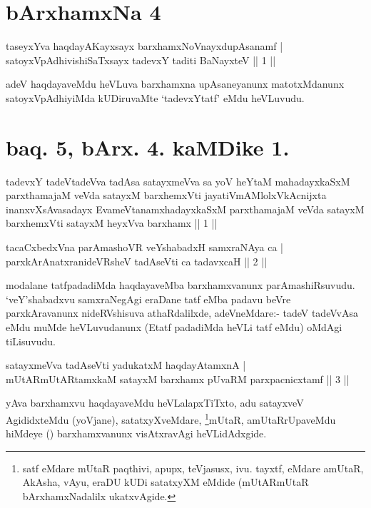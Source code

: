 
\section*{bArxhamxNa 4}

\begin{shl}
taseyxYva haqdayAKayxsayx barxhamxNoV\s nayxdupAsanamf | \\
satoyxVpAdhivishiSaTxsayx tadevxY taditi BaNayxteV \hfill ||  1 || 
\end{shl}

\begin{artha}
adeV haqdayaveMdu heVLuva barxhamxna upAsaneyanunx matotxMdanunx satoyxVpAdhiyiMda kUDiruvaMte `tadevxYtatf' eMdu heVLuvudu.
\end{artha}

\section*{baq. 5, bArx. 4. kaMDike 1.}
\begin{shl}
tadevxY tadeVtadeVva tadAsa satayxmeVva sa yoV heYtaM mahadayxkaSxM parxthamajaM veVda satayxM barxhemxVti jayatiVmAMlolxVkAcnijxta inanxvXsAvasadayx EvameVtanamxhadayxkaSxM parxthamajaM veVda satayxM barxhemxVti satayxM heyxVva barxhamx || 1 ||
\end{shl}

\begin{shl}
tacaCxbedxVna parAmashoVR veYshabadxH samxraNAya ca | \\
parxkArAnatxranideVRsheV tadAseVti ca tadavxcaH \hfill ||  2 || 
\end{shl}

\begin{artha}
modalane tatfpadadiMda haqdayaveMba barxhamxvanunx parAmashiRsuvudu. `veY'shabadxvu samxraNegAgi eraDane tatf eMba padavu beVre parxkAravanunx nideRVshisuva athaRdalilxde, adeVneMdare:- tadeV tadeVvA\s sa eMdu muMde heVLuvudanunx (Etatf padadiMda heVLi tatf eMdu) oMdAgi tiLisuvudu.
\end{artha}


\begin{shl}
satayxmeVva tadAseVti yadukatxM haqdayAtamxnA | \\
mUtARmUtARtamxkaM satayxM barxhamx pUvaRM parxpacnicxtamf \hfill ||  3 || 
\end{shl}

\begin{artha}
yAva barxhamxvu haqdayaveMdu heVLalapxTiTxto, adu satayxveV AgididxteMdu (yoVjane), satatxyXveMdare, \footnote{satf eMdare mUtaR paqthivi, apupx, teVjasusx, ivu. tayxtf, eMdare amUtaR, AkAsha, vAyu, eraDU kUDi satatxyXM eMdide (mUtARmUtaR bArxhamxNadalilx ukatxvAgide.}mUtaR, amUtaRrUpaveMdu hiMdeye (\quad) barxhamxvanunx visAtxravAgi heVLidAdxgide.
\end{artha}

